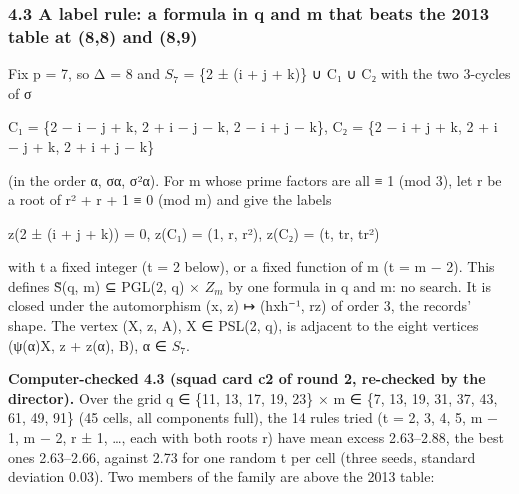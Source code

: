 \documentclass[
  10pt,
]{article}
\begin{document}
\hypertarget{a-label-rule-a-formula-in-q-and-m-that-beats-the-2013-table-at-88-and-89}{%
\subsubsection{4.3 A label rule: a formula in q and m that beats the
2013 table at (8,8) and
(8,9)}\label{a-label-rule-a-formula-in-q-and-m-that-beats-the-2013-table-at-88-and-89}}

Fix p = 7, so Δ = 8 and \(S_{7}\) = \{2 ± (i + j + k)\} ∪ C₁ ∪ C₂ with
the two 3-cycles of σ

C₁ = \{2 − i − j + k, 2 + i − j − k, 2 − i + j − k\}, C₂ = \{2 − i + j +
k, 2 + i − j + k, 2 + i + j − k\}

(in the order α, σα, σ²α). For m whose prime factors are all ≡ 1 (mod
3), let r be a root of r² + r + 1 ≡ 0 (mod m) and give the labels

z(2 ± (i + j + k)) = 0, z(C₁) = (1, r, r²), z(C₂) = (t, tr, tr²)

with t a fixed integer (t = 2 below), or a fixed function of m (t = m −
2). This defines S̃(q, m) ⊆ PGL(2, q) × \(Z_{m}\) by one formula in q and
m: no search. It is closed under the automorphism (x, z) ↦ (hxh⁻¹, rz)
of order 3, the records' shape. The vertex (X, z, A), X ∈ PSL(2, q), is
adjacent to the eight vertices (ψ(α)X, z + z(α), B), α ∈ \(S_{7}\).

\textbf{Computer-checked 4.3 (squad card c2 of round 2, re-checked by
the director).} Over the grid q ∈ \{11, 13, 17, 19, 23\} × m ∈ \{7, 13,
19, 31, 37, 43, 61, 49, 91\} (45 cells, all components full), the 14
rules tried (t = 2, 3, 4, 5, m − 1, m − 2, r ± 1, \ldots, each with both
roots r) have mean excess 2.63--2.88, the best ones 2.63--2.66, against
2.73 for one random t per cell (three seeds, standard deviation 0.03).
Two members of the family are above the 2013 table:
\end{document}
